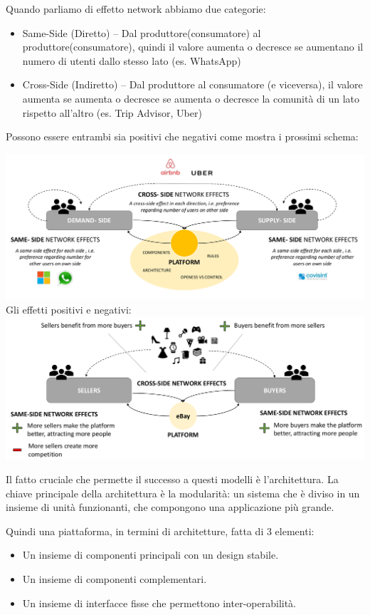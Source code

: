 \documentclass[]{article}
\begin{document}
Quando parliamo di effetto network abbiamo due categorie:

\begin{itemize}
	 
	\item
	Same-Side (Diretto) -- Dal produttore(consumatore) al
	produttore(consumatore), quindi il valore aumenta o decresce se
	aumentano il numero di utenti dallo stesso lato (es. WhatsApp)
	\item
	Cross-Side (Indiretto) -- Dal produttore al consumatore (e viceversa),
	il valore aumenta se aumenta o decresce se aumenta o decresce la
	comunità di un lato rispetto all'altro (es. Trip Advisor, Uber)
\end{itemize}

Possono essere entrambi sia positivi che negativi come mostra i prossimi
schema:

\includegraphics[scale=0.25]{image5.png}
Gli effetti positivi e negativi: \newline
\includegraphics[scale=0.25]{image6.png}


Il fatto cruciale che permette il successo a questi modelli è
l'architettura. La chiave principale della architettura è la modularità:
un sistema che è diviso in un insieme di unità funzionanti, che
compongono una applicazione più grande.

Quindi una piattaforma, in termini di architetture, fatta di 3 elementi:

\begin{itemize}
	 
	\item
	Un insieme di componenti principali con un design stabile.
	\item
	Un insieme di componenti complementari.
	\item
	Un insieme di interfacce fisse che permettono inter-operabilità.
\end{itemize}
\end{document}
